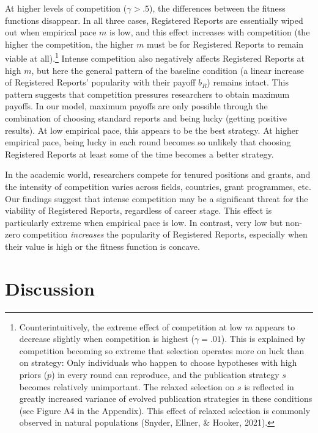 \documentclass[
  british,
  a4paper,
  ,man,floatsintext]{apa6}
\begin{document}
At higher levels of competition (\(\gamma > .5\)), the differences between the fitness functions disappear.
In all three cases, Registered Reports are essentially wiped out when empirical pace \(m\) is low, and this effect increases with competition (the higher the competition, the higher \(m\) must be for Registered Reports to remain viable at all).\footnote{Counterintuitively, the extreme effect of competition at low \(m\) appears to decrease slightly when competition is highest (\(\gamma = .01\)). This is explained by competition becoming so extreme that selection operates more on luck than on strategy: Only individuals who happen to choose hypotheses with high priors (\(p\)) in every round can reproduce, and the publication strategy \(s\) becomes relatively unimportant. The relaxed selection on \(s\) is reflected in greatly increased variance of evolved publication strategies in these conditions (see Figure A4 in the Appendix). This effect of relaxed selection is commonly observed in natural populations (Snyder, Ellner, \& Hooker, 2021).}
Intense competition also negatively affects Registered Reports at high \(m\), but here the general pattern of the baseline condition (a linear increase of Registered Reports' popularity with their payoff \(b_{R}\)) remains intact.
This pattern suggests that competition pressures researchers to obtain maximum payoffs.
In our model, maximum payoffs are only possible through the combination of choosing standard reports and being lucky (getting positive results).
At low empirical pace, this appears to be the best strategy.
At higher empirical pace, being lucky in each round becomes so unlikely that choosing Registered Reports at least some of the time becomes a better strategy.

In the academic world, researchers compete for tenured positions and grants, and the intensity of competition varies across fields, countries, grant programmes, etc.
Our findings suggest that intense competition may be a significant threat for the viability of Registered Reports, regardless of career stage.
This effect is particularly extreme when empirical pace is low.
In contrast, very low but non-zero competition \emph{increases} the popularity of Registered Reports, especially when their value is high or the fitness function is concave.

\section{Discussion}\label{discussion}
\end{document}
